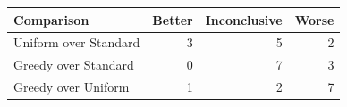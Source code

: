\begin{tabular}{@{}lrrr@{}}
\toprule
Comparison & Better & Inconclusive & Worse \\
\midrule
Uniform over Standard & 3 & 5 & 2 \\
Greedy over Standard & 0 & 7 & 3 \\
Greedy over Uniform & 1 & 2 & 7 \\
\bottomrule
\end{tabular}
